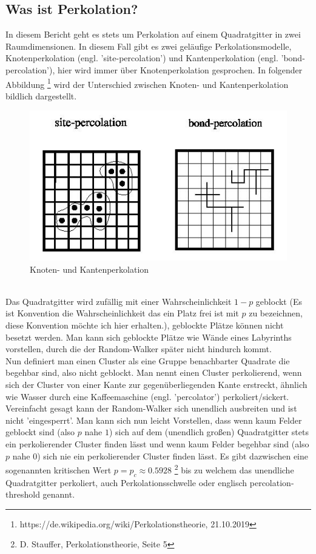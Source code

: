 \documentclass[a4paper, 12pt]{scrartcl}
\begin{document}
\subsection{Was ist Perkolation?}
In diesem Bericht geht es stets um Perkolation auf einem Quadratgitter in zwei Raumdimensionen. In diesem Fall gibt es zwei geläufige Perkolationsmodelle, Knotenperkolation (engl. 'site-percolation') und Kantenperkolation (engl. 'bond-percolation'), hier wird immer über Knotenperkolation gesprochen. In folgender Abbildung \footnote{https://de.wikipedia.org/wiki/Perkolationstheorie, 21.10.2019} wird der Unterschied zwischen Knoten- und Kantenperkolation bildlich dargestellt.
\begin{figure}[h!]
\centering
\includegraphics[scale=0.6]{Percolation1.jpg}
\caption{Knoten- und Kantenperkolation}
\end{figure}
\vspace{0,5cm}
\\
Das Quadratgitter wird zufällig mit einer Wahrscheinlichkeit $1-p$ geblockt (Es ist Konvention die Wahrscheinlichkeit das ein Platz frei ist mit $p$ zu bezeichnen, diese Konvention möchte ich hier erhalten.), geblockte Plätze können nicht besetzt werden. Man kann sich geblockte Plätze wie Wände eines Labyrinths vorstellen, durch die der Random-Walker später nicht hindurch kommt.  
\\
Nun definiert man einen Cluster als eine Gruppe benachbarter Quadrate die begehbar sind, also nicht geblockt. Man nennt einen Cluster perkolierend, wenn sich der Cluster von einer Kante zur gegenüberliegenden Kante erstreckt, ähnlich wie Wasser durch eine Kaffeemaschine (engl. 'percolator') perkoliert/sickert. Vereinfacht gesagt kann der Random-Walker sich unendlich ausbreiten und ist nicht 'eingesperrt'. Man kann sich nun leicht Vorstellen, dass wenn kaum Felder geblockt sind (also $p$ nahe $1$) sich auf dem (unendlich großen) Quadratgitter stets ein perkolierender Cluster finden lässt und wenn kaum Felder begehbar sind (also $p$ nahe $0$) sich nie ein perkolierender Cluster finden lässt. Es gibt dazwischen eine sogenannten kritischen Wert $p=p_c \approx 0.5928$ \footnote{D. Stauffer, Perkolationstheorie, Seite 5} bis zu welchem das unendliche Quadratgitter perkoliert, auch Perkolationsschwelle oder englisch percolation-threshold genannt.
\end{document}
